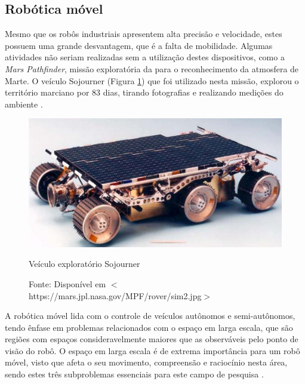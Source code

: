 \vspace{1cm}
\subsection{Robótica móvel}	


Mesmo que os robôs industriais apresentem alta precisão e velocidade, estes possuem uma grande desvantagem, que é a falta 
de mobilidade. %
Algumas atividades não seriam realizadas sem a utilização destes dispositivos, como a 
\textit{Mars Pathfinder}, missão exploratória da 
 para o reconhecimento da atmosfera de Marte. O 
veículo Sojourner (Figura \ref{fig:nasa}) que foi utilizado nesta missão, explorou o território marciano por 83 dias, 
tirando fotografias e realizando 
medições do ambiente \cite{nasa}.

\begin{figure}[th]
 \centering
 \captionsetup{width=0.5\textwidth,font=footnotesize,textfont=bf}
 \includegraphics[scale=0.4]{figuras/nasa.png}
 \caption{Veículo exploratório Sojourner \label{fig:nasa}}
 \vspace{-0.3cm}
 \caption*{Fonte: Disponível em $<$https://mars.jpl.nasa.gov/MPF/rover/sim2.jpg$>$}
\end{figure}


A robótica móvel lida com o controle de veículos autônomos e semi-autônomos, tendo ênfase em problemas relacionados com o 
espaço em larga escala, que são regiões com espaços consideravelmente maiores que as observáveis pelo ponto de visão 
do robô. O espaço em larga escala é de extrema importância para um robô móvel, visto que afeta 
o seu movimento, compreensão e raciocínio nesta área, sendo estes três subproblemas essenciais para este campo de pesquisa
\cite{dudek_mobile}.

